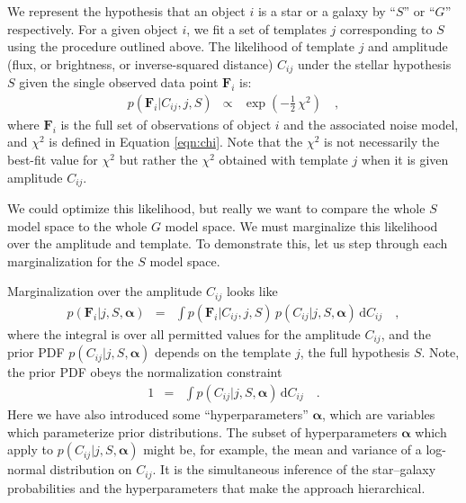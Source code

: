 \documentclass[12pt,preprint]{aastex}
\newcommand{\datavector}[1]{\boldsymbol{#1}}
\newcommand{\flux}{\datavector{F}}
\newcommand{\hyperpars}{\datavector{\alpha}}
\newcommand{\dd}{\mathrm{d}}
\begin{document}
We represent the hypothesis that an object $i$ is a star or a galaxy
by ``$S$'' or ``$G$'' respectively.  For a given object $i$, we fit a
set of templates $j$ corresponding to $S$ using the procedure outlined
above.  The likelihood of template $j$ and amplitude (flux, or
brightness, or inverse-squared distance) $C_{ij}$ under the stellar
hypothesis $S$ given the single observed data point $\flux_i$ is:
\begin{eqnarray}\displaystyle
p(\flux_i|C_{ij},j,S) & \propto & \exp(-\frac{1}{2}\,\chi^2)
\quad ,
\end{eqnarray}
where $\flux_i$ is the full set of observations of object $i$ and the
associated noise model, and $\chi^2$ is defined in Equation \ref{eqn:chi}. Note
that the $\chi^2$ is not necessarily the best-fit value for $\chi^2$
but rather the $\chi^2$ obtained with template $j$ when it is given
amplitude $C_{ij}$.

We could optimize this likelihood, but really we want to compare the
whole $S$ model space to the whole $G$ model space.  We must
marginalize this likelihood over the amplitude and template.  To 
demonstrate this, let us step through each marginalization for the 
$S$ model space.

Marginalization over the amplitude $C_{ij}$ looks like
\begin{eqnarray}\displaystyle
p(\flux_i|j,S,\hyperpars) & = & \int p(\flux_i|C_{ij},j,S)\,p(C_{ij}|j,S,\hyperpars)\,\dd C_{ij}
\quad ,
\end{eqnarray}
where the integral is over all permitted values for the amplitude
$C_{ij}$, and the prior PDF $p(C_{ij}|j,S,\hyperpars)$ depends on the
template $j$, the full hypothesis $S$.  Note, the prior PDF obeys the normalization
constraint
\begin{eqnarray}\displaystyle
1 & = & \int p(C_{ij}|j,S,\hyperpars)\,\dd C_{ij}
\quad .
\end{eqnarray}
\noindent Here we have also introduced some 
``hyperparameters'' $\hyperpars$, which are variables which parameterize 
prior distributions.  The subset of hyperparameters $\hyperpars$ which 
apply to $p(C_{ij}|j,S,\hyperpars)$ might be, for example, the mean and variance of 
a log-normal distribution on $C_{ij}$.   It is the simultaneous inference
of the star--galaxy probabilities and the hyperparameters that
make the approach hierarchical.  
\end{document}
